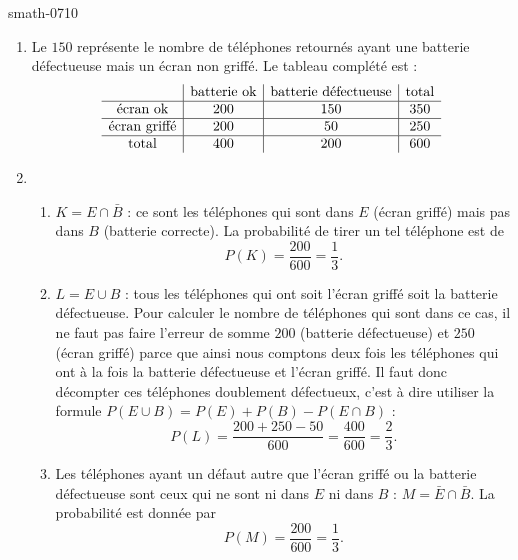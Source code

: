
\begin{corrige}{smath-0710}

    \begin{enumerate}
        \item
            Le \( 150\) représente le nombre de téléphones retournés ayant une batterie défectueuse mais un écran non griffé. Le tableau complété est :
    \begin{equation*}
        \begin{array}[]{c|c|c|c}
            &\text{batterie ok}&\text{batterie défectueuse}&\text{total}\\
            \hline
            \text{écran ok}&200&150&350\\
            \hline
            \text{écran griffé}&200&50&250\\
            \hline
            \text{total}&400&200&600\\
        \end{array}
    \end{equation*}
\item
    \begin{enumerate}
        \item
            \( K=E\cap \bar B\) : ce sont les téléphones qui sont dans \( E\) (écran griffé) mais pas dans \( B\) (batterie correcte). La probabilité de tirer un tel téléphone est de
            \begin{equation}
                P(K)=\frac{ 200 }{ 600 }=\frac{1}{ 3 }.
            \end{equation}
        \item
            \( L=E\cup B\) : tous les téléphones qui ont soit l'écran griffé soit la batterie défectueuse. Pour calculer le nombre de téléphones qui sont dans ce cas, il ne faut pas faire l'erreur de somme \( 200\) (batterie défectueuse) et \( 250\) (écran griffé) parce que ainsi nous comptons deux fois les téléphones qui ont à la fois la batterie défectueuse et l'écran griffé. Il faut donc décompter ces téléphones doublement défectueux, c'est à dire utiliser la formule \( P(E\cup B)=P(E)+P(B)-P(E\cap B)\) :
            \begin{equation}
                P(L)=\frac{ 200+250-50 }{ 600 }=\frac{ 400 }{ 600 }=\frac{ 2 }{ 3 }.
            \end{equation}
        \item
            Les téléphones ayant un défaut autre que l'écran griffé ou la batterie défectueuse sont ceux qui ne sont ni dans \( E\) ni dans \( B\) : \( M=\bar E\cap  \bar B\). La probabilité est donnée par
            \begin{equation}
                P(M)=\frac{ 200 }{ 600 }=\frac{1}{ 3 }.
            \end{equation}
    \end{enumerate}
    \end{enumerate}

\end{corrige}
